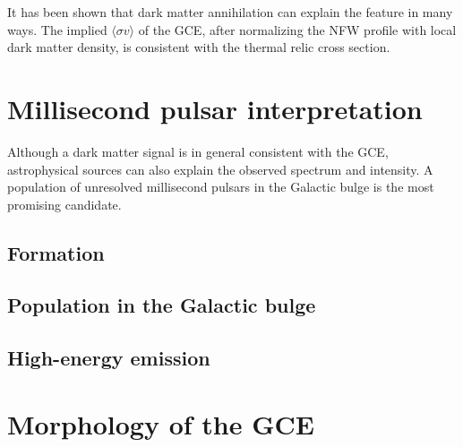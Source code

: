 \documentclass[doublespace,nopageskip]{VTthesis} %
\newcommand{\sigmav}{\langle\sigma v\rangle}
\begin{document}
It has been shown that dark matter annihilation can explain the feature in many ways. The implied $\sigmav$ of the GCE, after normalizing the NFW profile with local dark matter density, is consistent with the thermal relic cross section.






\section{Millisecond pulsar interpretation}

Although a dark matter signal is in general consistent with the GCE,  astrophysical sources can also explain the observed spectrum and intensity. A population of unresolved millisecond pulsars in the Galactic bulge is the most promising candidate.

\subsection{Formation}



\subsection{Population in the Galactic bulge}

\subsection{High-energy emission}

\section{Morphology of the GCE}
\end{document}
